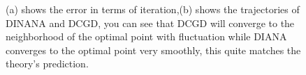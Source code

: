 \documentclass[12pt,a4paper]{article}
\begin{document}
	\begin{figure}
		\centering
	
		
		\caption{ (a) shows the error in terms of iteration,(b)  shows the trajectories of DINANA and DCGD, you can see that DCGD will converge to the neighborhood of  the optimal point with fluctuation while DIANA converges to the optimal point very smoothly, this quite matches the theory's prediction.} %
		\label{img2}
	\end{figure}
	
	
	
	
\end{document}
